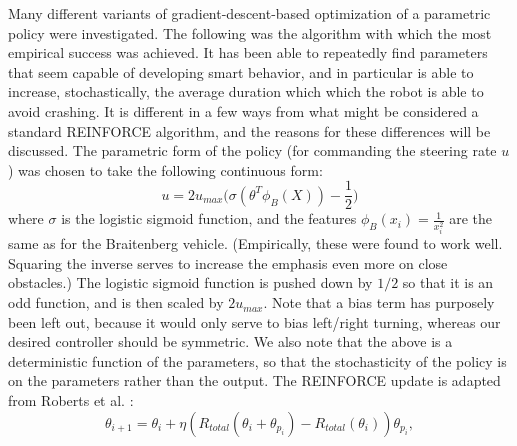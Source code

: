 \documentclass{article}
\begin{document}
Many different variants of gradient-descent-based optimization of a parametric policy were investigated.  The following was the algorithm with which the most empirical success was achieved.  It has been able to repeatedly find parameters that seem capable of developing smart behavior, and in particular is able to increase, stochastically, the average duration which which the robot is able to avoid crashing.  It is different in a few ways from what might be considered a standard REINFORCE algorithm, and the reasons for these differences will be discussed.  The parametric form of the policy (for commanding the steering rate $u$) was chosen to take the following continuous form: 
%
%
\begin{equation}
\label{u_continuous}
u = 2 u_{max} \bigg(\sigma(\theta^T \phi_B(X)) - \frac{1}{2}\bigg) 
\end{equation}
%
%
where $\sigma$ is the logistic sigmoid function, and the features $\phi_B(x_i) = \frac{1}{x_i^2}$ are the same as for the Braitenberg vehicle.  (Empirically, these were found to work well.  Squaring the inverse serves to increase the emphasis even more on close obstacles.)  The logistic sigmoid function is pushed down by $1/2$ so that it is an odd function, and is then scaled by $2u_{max}$.  Note that a bias term has purposely been left out, because it would only serve to bias left/right turning, whereas our desired controller should be symmetric.  We also note that the above is a deterministic function of the parameters, so that the stochasticity of the policy is on the parameters rather than the output.  The REINFORCE update is adapted from Roberts et al. \cite{Roberts11}:
%
%
\begin{equation}
\theta_{i+1} = \theta_i + \eta (R_{total}(\theta_i + \theta_{p_i}) - R_{total}(\theta_i)) \theta_{p_i},
\end{equation}
%
%
\end{document}
